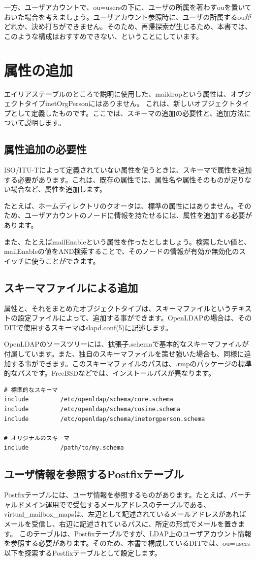 一方、ユーザアカウントで、ou=usersの下に、ユーザの所属を著わすouを置いておいた場合を考えましょう。ユーザアカウント参照時に、ユーザの所属するouがどれか、決め打ちができません。そのため、再帰探索が生じるため、本書では、このような構成はおすすめできない、ということにしています。

\section{属性の追加}

エイリアステーブルのところで説明に使用した、maildropという属性は、オブジェクトタイプinetOrgPersonにはありません。
これは、新しいオブジェクトタイプとして定義したものです。ここでは、スキーマの追加の必要性と、追加方法について説明します。

\subsection{属性追加の必要性}

ISO/ITU-Tによって定義されていない属性を使うときは、スキーマで属性を追加する必要があります。これは、既存の属性では、属性名や属性そのものが足りない場合など、属性を追加します。

たとえば、ホームディレクトリのクオータは、標準の属性にはありません。そのため、ユーザアカウントのノードに情報を持たせるには、属性を追加する必要があります。

また、たとえばmailEnableという属性を作ったとしましょう。検索したい値と、mailEnableの値をAND検索することで、そのノードの情報が有効か無効化のスイッチに使うことができます。


\subsection{スキーマファイルによる追加}

属性と、それをまとめたオブジェクトタイプは、スキーマファイルというテキストの設定ファイルによって、追加する事ができます。OpenLDAPの場合は、そのDITで使用するスキーマはslapd.conf(5)に記述します。

OpenLDAPのソースツリーには、拡張子.schemaで基本的なスキーマファイルが付属しています。また、独自のスキーマファイルを策せ強いた場合も、同様に追加する事ができます。このスキーマファイルのパスは、.rmpのパッケージの標準的なパスです。FreeBSDなどでは、インストールパスが異なります。

\begin{verbatim}
# 標準的なスキーマ
include         /etc/openldap/schema/core.schema
include         /etc/openldap/schema/cosine.schema
include         /etc/openldap/schema/inetorgperson.schema

# オリジナルのスキーマ
include         /path/to/my.schema
\end{verbatim}

\subsection{ユーザ情報を参照するPostfixテーブル}
Postfixテーブルには、ユーザ情報を参照するものがあります。たとえば、バーチャルドメイン運用でで受信するメールアドレスのテーブルである、virtual\_mailbox\_mapsは、左辺として記述されているメールアドレスがあればメールを受信し、右辺に記述されているパスに、所定の形式でメールを置きます。
このテーブルは、Postfixテーブルですが、LDAP上のユーザアカウント情報を参照する必要があります。そのため、本書で構成しているDITでは、ou=users以下を探索するPostfixテーブルとして設定します。